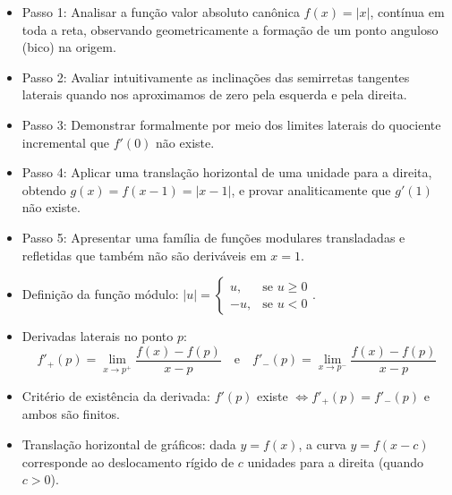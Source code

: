 \begin{estrategiabox}
  \begin{itemize}[noitemsep, topsep=2pt]
    \item Passo 1: Analisar a função valor absoluto canônica $f(x) = |x|$, contínua em toda a reta, observando geometricamente a formação de um ponto anguloso (bico) na origem.
    \item Passo 2: Avaliar intuitivamente as inclinações das semirretas tangentes laterais quando nos aproximamos de zero pela esquerda e pela direita.
    \item Passo 3: Demonstrar formalmente por meio dos limites laterais do quociente incremental que $f'(0)$ não existe.
    \item Passo 4: Aplicar uma translação horizontal de uma unidade para a direita, obtendo $g(x) = f(x - 1) = |x - 1|$, e provar analiticamente que $g'(1)$ não existe.
    \item Passo 5: Apresentar uma família de funções modulares transladadas e refletidas que também não são deriváveis em $x = 1$.
  \end{itemize}
\end{estrategiabox}

\vspace{0.3cm}

\begin{recursosbox}
  \begin{itemize}[noitemsep, topsep=2pt]
    \item Definição da função módulo: $|u| = \begin{cases} u, & \text{se } u \ge 0 \\ -u, & \text{se } u < 0 \end{cases}$.
    \item Derivadas laterais no ponto $p$:
    \[
    f'_+(p) = \lim_{x \to p^+} \frac{f(x) - f(p)}{x - p} \quad \text{e} \quad f'_-(p) = \lim_{x \to p^-} \frac{f(x) - f(p)}{x - p}
    \]
    \item Critério de existência da derivada: $f'(p)$ existe $\iff f'_+(p) = f'_-(p)$ e ambos são finitos.
    \item Translação horizontal de gráficos: dada $y = f(x)$, a curva $y = f(x - c)$ corresponde ao deslocamento rígido de $c$ unidades para a direita (quando $c > 0$).
  \end{itemize}
\end{recursosbox}

\vspace{0.4cm}

